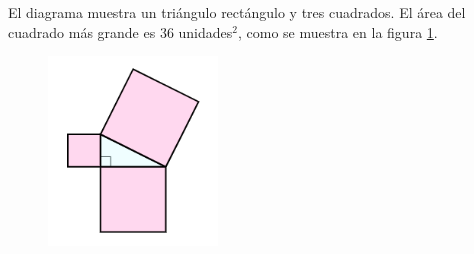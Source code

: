 El diagrama muestra un triángulo rectángulo y tres cuadrados.
El área del cuadrado más grande es 36 unidades$^2$, como se muestra en la figura \ref{fig:area13}.
\begin{multicols}{2}
    \begin{figure}[H]
        \centering
        \includegraphics[width=0.4\textwidth]{../images/area13.png}
        \caption{}
        \label{fig:area13}
    \end{figure}

    \columnbreak

    \end{multicols}
